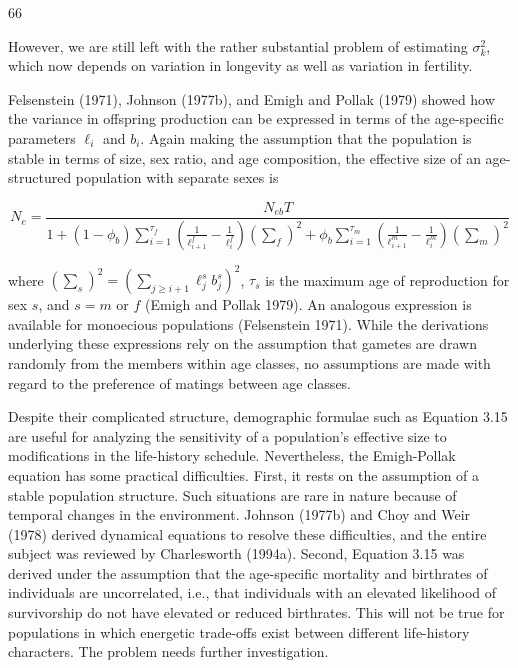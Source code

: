\documentclass{article}
\begin{document}
66

However, we are still left with the rather substantial problem of estimating  $ \sigma_{k}^{2} $, which now depends on variation in longevity as well as variation in fertility.

Felsenstein (1971), Johnson (1977b), and Emigh and Pollak (1979) showed how the variance in offspring production can be expressed in terms of the age-specific parameters  $ \ell_{i} $ and  $ b_{i} $. Again making the assumption that the population is stable in terms of size, sex ratio, and age composition, the effective size of an age-structured population with separate sexes is

\begin{equation}
N_{e}=\frac{N_{eb}T}{1+\left(1-\phi_{b}\right)\sum_{i=1}^{\tau_{f}}\left(\frac{1}{\ell_{i+1}^{f}}-\frac{1}{\ell_{i}^{f}}\right)\left(\sum_{f}\right)^{2}+\phi_{b}\sum_{i=1}^{\tau_{m}}\left(\frac{1}{\ell_{i+1}^{m}}-\frac{1}{\ell_{i}^{m}}\right)\left(\sum_{m}\right)^{2}}
\tag{3.15}
\label{eq:3_15}
\end{equation}

where  $ (\sum_s)^2 = \left( \sum_{j \geq i+1} \ell_j^s b_j^s \right)^2 $,  $ \tau_s $ is the maximum age of reproduction for sex  $ s $, and  $ s = m $ or  $ f $ (Emigh and Pollak 1979). An analogous expression is available for monoecious populations (Felsenstein 1971). While the derivations underlying these expressions rely on the assumption that gametes are drawn randomly from the members within age classes, no assumptions are made with regard to the preference of matings between age classes.

Despite their complicated structure, demographic formulae such as Equation 3.15 are useful for analyzing the sensitivity of a population's effective size to modifications in the life-history schedule. Nevertheless, the Emigh-Pollak equation has some practical difficulties. First, it rests on the assumption of a stable population structure. Such situations are rare in nature because of temporal changes in the environment. Johnson (1977b) and Choy and Weir (1978) derived dynamical equations to resolve these difficulties, and the entire subject was reviewed by Charlesworth (1994a). Second, Equation 3.15 was derived under the assumption that the age-specific mortality and birthrates of individuals are uncorrelated, i.e., that individuals with an elevated likelihood of survivorship do not have elevated or reduced birthrates. This will not be true for populations in which energetic trade-offs exist between different life-history characters. The problem needs further investigation.
\end{document}
